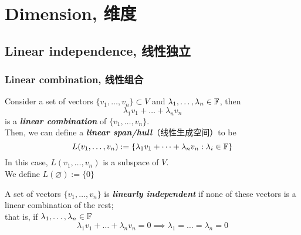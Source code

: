 \section{Dimension, 维度}
\subsection{Linear independence, 线性独立}
\subsubsection{Linear combination, 线性组合}
\begin{definition}
    Consider a set of vectors $\{v_1, \dots, v_n\} \subset V$ and $\lambda_1, \dots, \lambda_n \in \mathbb{F}$, then
    $$\lambda_1 v_1 + \dots + \lambda_n v_n$$
    is a \textbf{\textit{linear combination}} of $\{v_1, \dots, v_n\}$. \\
    Then, we can define a \textbf{\textit{linear span/hull}}（线性生成空间）to be
    $$L(v_1, \dots, v_n) := \{\lambda_1 v_1 + \dots + \lambda_n v_n: \lambda_i \in \mathbb{F} \}$$
    In this case, $L(v_1, \dots, v_n)$ is a subspace of $V$. \\
    We define $L(\varnothing) := \{0\}$
\end{definition}
\begin{definition}
    A set of vectors $\{v_1, \dots, v_n\}$ is \textbf{\textit{linearly independent}} if none of these vectors is a linear combination of the rest; \\
    that is, if $\lambda_1, \dots, \lambda_n \in \mathbb{F}$
    $$\lambda_1 v_1 + \dots + \lambda_n v_n = 0 \implies \lambda_1 = \dots = \lambda_n = 0$$
\end{definition}

